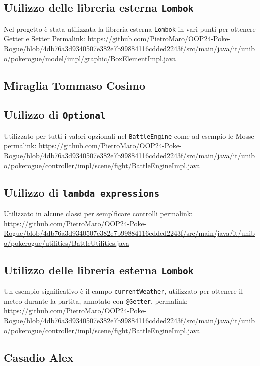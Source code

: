 \documentclass[a4paper,12pt]{report}
\begin{document}
{{\subsection*{Utilizzo delle libreria esterna \texttt{Lombok}}
Nel progetto è stata utilizzata la libreria esterna \texttt{Lombok} in vari punti per ottenere Getter e Setter
Permalink: \url{https://github.com/PietroMaro/OOP24-Poke-Rogue/blob/4db76a3d9340507e382e7b99884116cdded2243f/src/main/java/it/unibo/pokerogue/model/impl/graphic/BoxElementImpl.java}


\subsection{Miraglia Tommaso Cosimo}

\subsection*{Utilizzo di \texttt{Optional}}
Utilizzato per tutti i valori opzionali nel  \texttt{BattleEngine} come ad esempio le Mosse 
permalink: \url{https://github.com/PietroMaro/OOP24-Poke-Rogue/blob/4db76a3d9340507e382e7b99884116cdded2243f/src/main/java/it/unibo/pokerogue/controller/impl/scene/fight/BattleEngineImpl.java}

\subsection*{Utilizzo di \texttt{lambda expressions}}
Utilizzato in alcune classi per semplficare controlli
permalink: \url{https://github.com/PietroMaro/OOP24-Poke-Rogue/blob/4db76a3d9340507e382e7b99884116cdded2243f/src/main/java/it/unibo/pokerogue/utilities/BattleUtilities.java}

\subsection*{Utilizzo delle libreria esterna \texttt{Lombok}}
Un esempio significativo è il campo \texttt{currentWeather}, utilizzato per ottenere il meteo durante la partita, annotato con \texttt{@Getter}.
permalink: \url{https://github.com/PietroMaro/OOP24-Poke-Rogue/blob/4db76a3d9340507e382e7b99884116cdded2243f/src/main/java/it/unibo/pokerogue/controller/impl/scene/fight/BattleEngineImpl.java}

\subsection{Casadio Alex}

}}
\end{document}
